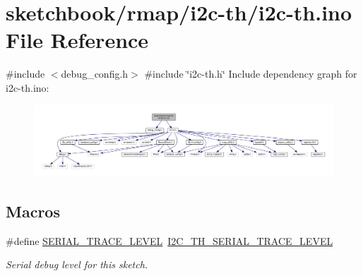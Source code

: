 \hypertarget{i2c-th_8ino}{}\section{sketchbook/rmap/i2c-\/th/i2c-\/th.ino File Reference}
\label{i2c-th_8ino}
{\ttfamily \#include $<$debug\+\_\+config.\+h$>$}\newline
{\ttfamily \#include \char`\"{}i2c-\/th.\+h\char`\"{}}\newline
Include dependency graph for i2c-\/th.ino\+:
\nopagebreak
\begin{figure}[H]
\begin{center}
\leavevmode
\includegraphics[width=350pt]{i2c-th_8ino__incl}
\end{center}
\end{figure}
\subsection*{Macros}
\begin{DoxyCompactItemize}
\item 
\mbox{\label{i2c-th_8ino_a31fa5c36fa17c66feec7a67b76c3e786}} 
\#define \hyperlink{i2c-th_8ino_a31fa5c36fa17c66feec7a67b76c3e786}{S\+E\+R\+I\+A\+L\+\_\+\+T\+R\+A\+C\+E\+\_\+\+L\+E\+V\+EL}~\hyperlink{debug__config_8h_a0138759b880270bd48d1f329c5c0af4d}{I2\+C\+\_\+\+T\+H\+\_\+\+S\+E\+R\+I\+A\+L\+\_\+\+T\+R\+A\+C\+E\+\_\+\+L\+E\+V\+EL}
\begin{DoxyCompactList}\small\item\em Serial debug level for this sketch. \end{DoxyCompactList}\end{DoxyCompactItemize}
